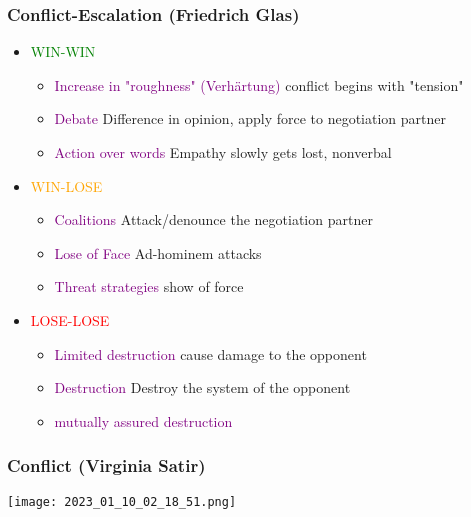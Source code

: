 \documentclass[main.tex,fontsize=12pt,paper=a4,paper=landscape,DIV=calc,]{scrartcl}
\begin{document}
\begin{multicols*}{2}
\subsubsection{Conflict-Escalation (Friedrich Glas)}
\begin{itemize}
\item \textcolor{green}{WIN-WIN}\newline
  \begin{itemize}
  \item \textcolor{purple}{Increase in "roughness" (Verhärtung)}\newline
    conflict begins with "tension"
  \item \textcolor{purple}{Debate}\newline
    Difference in opinion, apply force to negotiation partner
  \item \textcolor{purple}{Action over words}\newline
    Empathy slowly gets lost, nonverbal
  \end{itemize} 
\item \textcolor{orange}{WIN-LOSE}
  \begin{itemize}
  \item \textcolor{purple}{Coalitions}\newline
    Attack/denounce the negotiation partner
  \item \textcolor{purple}{Lose of Face}\newline
    Ad-hominem attacks
  \item \textcolor{purple}{Threat strategies}\newline
    show of force
  \end{itemize} 
\item \textcolor{red}{LOSE-LOSE}
  \begin{itemize}
  \item \textcolor{purple}{Limited destruction}\newline
    cause damage to the opponent
  \item \textcolor{purple}{Destruction}\newline
    Destroy the system of the opponent
  \item \textcolor{purple}{mutually assured destruction}\newline
  \end{itemize} 
\end{itemize}

\subsubsection{Conflict (Virginia Satir)}
\texttt{[image: 2023\_01\_10\_02\_18\_51.png]}


\end{multicols*}
\end{document}
